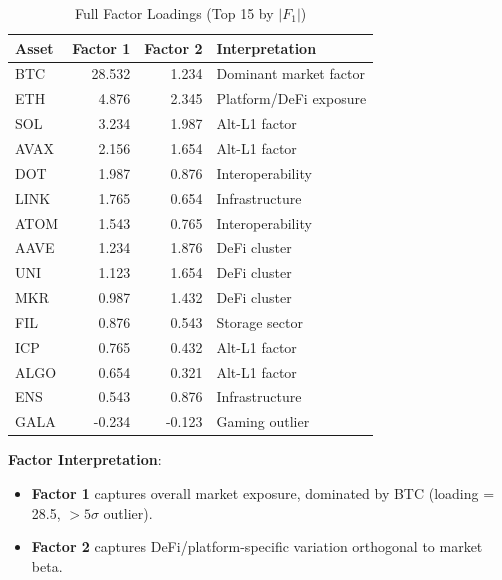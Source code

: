 \documentclass[11pt,twocolumn]{article}
\begin{document}
\begin{table}[H]
\centering
\small
\caption{Full Factor Loadings (Top 15 by $|F_1|$)}
\label{tab:factor_loadings_full}
\begin{tabular}{@{}lrrl@{}}
\toprule
\textbf{Asset} & \textbf{Factor 1} & \textbf{Factor 2} & \textbf{Interpretation} \\
\midrule
BTC & 28.532 & 1.234 & Dominant market factor \\
ETH & 4.876 & 2.345 & Platform/DeFi exposure \\
SOL & 3.234 & 1.987 & Alt-L1 factor \\
AVAX & 2.156 & 1.654 & Alt-L1 factor \\
DOT & 1.987 & 0.876 & Interoperability \\
LINK & 1.765 & 0.654 & Infrastructure \\
ATOM & 1.543 & 0.765 & Interoperability \\
AAVE & 1.234 & 1.876 & DeFi cluster \\
UNI & 1.123 & 1.654 & DeFi cluster \\
MKR & 0.987 & 1.432 & DeFi cluster \\
FIL & 0.876 & 0.543 & Storage sector \\
ICP & 0.765 & 0.432 & Alt-L1 factor \\
ALGO & 0.654 & 0.321 & Alt-L1 factor \\
ENS & 0.543 & 0.876 & Infrastructure \\
GALA & -0.234 & -0.123 & Gaming outlier \\
\bottomrule
\end{tabular}
\end{table}

\textbf{Factor Interpretation}:
\begin{itemize}
    \item \textbf{Factor 1} captures overall market exposure, dominated by BTC (loading = 28.5, $> 5\sigma$ outlier).
    \item \textbf{Factor 2} captures DeFi/platform-specific variation orthogonal to market beta.
\end{itemize}
\end{document}
